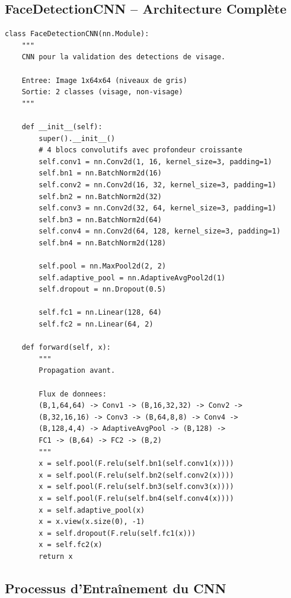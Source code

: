 \subsection{FaceDetectionCNN -- Architecture Complète}

\begin{lstlisting}[style=pythonstyle, caption={Architecture du FaceDetectionCNN.}, label={lst:face_cnn}]
class FaceDetectionCNN(nn.Module):
    """
    CNN pour la validation des detections de visage.
    
    Entree: Image 1x64x64 (niveaux de gris)
    Sortie: 2 classes (visage, non-visage)
    """
    
    def __init__(self):
        super().__init__()
        # 4 blocs convolutifs avec profondeur croissante
        self.conv1 = nn.Conv2d(1, 16, kernel_size=3, padding=1)
        self.bn1 = nn.BatchNorm2d(16)
        self.conv2 = nn.Conv2d(16, 32, kernel_size=3, padding=1)
        self.bn2 = nn.BatchNorm2d(32)
        self.conv3 = nn.Conv2d(32, 64, kernel_size=3, padding=1)
        self.bn3 = nn.BatchNorm2d(64)
        self.conv4 = nn.Conv2d(64, 128, kernel_size=3, padding=1)
        self.bn4 = nn.BatchNorm2d(128)
        
        self.pool = nn.MaxPool2d(2, 2)
        self.adaptive_pool = nn.AdaptiveAvgPool2d(1)
        self.dropout = nn.Dropout(0.5)
        
        self.fc1 = nn.Linear(128, 64)
        self.fc2 = nn.Linear(64, 2)
    
    def forward(self, x):
        """
        Propagation avant.
        
        Flux de donnees:
        (B,1,64,64) -> Conv1 -> (B,16,32,32) -> Conv2 -> 
        (B,32,16,16) -> Conv3 -> (B,64,8,8) -> Conv4 -> 
        (B,128,4,4) -> AdaptiveAvgPool -> (B,128) -> 
        FC1 -> (B,64) -> FC2 -> (B,2)
        """
        x = self.pool(F.relu(self.bn1(self.conv1(x))))
        x = self.pool(F.relu(self.bn2(self.conv2(x))))
        x = self.pool(F.relu(self.bn3(self.conv3(x))))
        x = self.pool(F.relu(self.bn4(self.conv4(x))))
        x = self.adaptive_pool(x)
        x = x.view(x.size(0), -1)
        x = self.dropout(F.relu(self.fc1(x)))
        x = self.fc2(x)
        return x
\end{lstlisting}

\subsection{Processus d'Entraînement du CNN}

